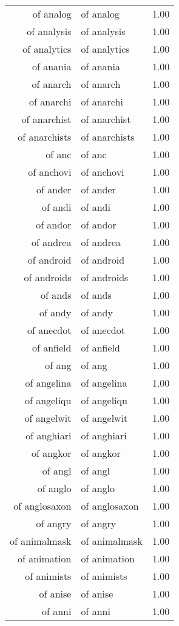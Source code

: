 \begin{table}[ht]
\begin{tabular}{rlr}
  of analog & of analog & 1.00 \\ 
  of analysis & of analysis & 1.00 \\ 
  of analytics & of analytics & 1.00 \\ 
  of anania & of anania & 1.00 \\ 
  of anarch & of anarch & 1.00 \\ 
  of anarchi & of anarchi & 1.00 \\ 
  of anarchist & of anarchist & 1.00 \\ 
  of anarchists & of anarchists & 1.00 \\ 
  of anc & of anc & 1.00 \\ 
  of anchovi & of anchovi & 1.00 \\ 
  of ander & of ander & 1.00 \\ 
  of andi & of andi & 1.00 \\ 
  of andor & of andor & 1.00 \\ 
  of andrea & of andrea & 1.00 \\ 
  of android & of android & 1.00 \\ 
  of androids & of androids & 1.00 \\ 
  of ands & of ands & 1.00 \\ 
  of andy & of andy & 1.00 \\ 
  of anecdot & of anecdot & 1.00 \\ 
  of anfield & of anfield & 1.00 \\ 
  of ang & of ang & 1.00 \\ 
  of angelina & of angelina & 1.00 \\ 
  of angeliqu & of angeliqu & 1.00 \\ 
  of angelwit & of angelwit & 1.00 \\ 
  of anghiari & of anghiari & 1.00 \\ 
  of angkor & of angkor & 1.00 \\ 
  of angl & of angl & 1.00 \\ 
  of anglo & of anglo & 1.00 \\ 
  of anglosaxon & of anglosaxon & 1.00 \\ 
  of angry & of angry & 1.00 \\ 
  of animalmask & of animalmask & 1.00 \\ 
  of animation & of animation & 1.00 \\ 
  of animists & of animists & 1.00 \\ 
  of anise & of anise & 1.00 \\ 
  of anni & of anni & 1.00 \\ 

\end{tabular}
\end{table}
